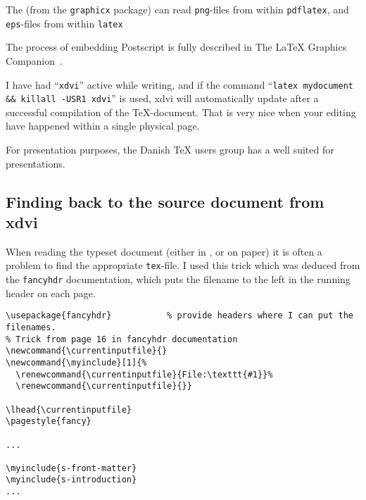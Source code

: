 The  (from the \texttt{graphicx} package)
can read \texttt{png}-files from within \texttt{pdflatex}, and
\texttt{eps}-files from within \texttt{latex}


The process of embedding Postscript is fully described in The {\LaTeX}
Graphics
Companion~\cite{goosens-rahtz-mittelbach:the-latex-graphics-companion}.


I have had ``\texttt{xdvi}'' active while writing, and if the command
``\texttt{latex mydocument \&\& killall -USR1 xdvi}'' is used, xdvi
will automatically update after a successful compilation of the
TeX-document.  That is very nice when your editing have happened
within a single physical page.

For presentation purposes, the Danish TeX users group has a
 well suited for
presentations.

\subsection{Finding back to the source document from xdvi}

When reading the typeset document (either in ,
 or on paper) it is often a problem to find the
appropriate \texttt{tex}-file.  I used this trick which was deduced
from the \texttt{fancyhdr} documentation, which puts the
filename to the left in the running header on each page.

\begin{verbatim}
\usepackage{fancyhdr}           % provide headers where I can put the filenames.
% Trick from page 16 in fancyhdr documentation
\newcommand{\currentinputfile}{}
\newcommand{\myinclude}[1]{%
  \renewcommand{\currentinputfile}{File:\texttt{#1}}%
  \renewcommand{\currentinputfile}{}}

\lhead{\currentinputfile}
\pagestyle{fancy}

...

\myinclude{s-front-matter}
\myinclude{s-introduction}
...
\end{verbatim}

